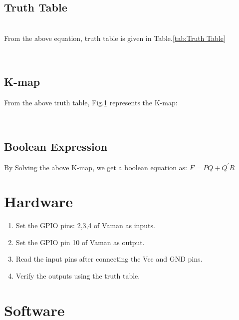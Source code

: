 \documentclass[journal,twocolumn,10pt, a4paper]{article}
\begin{document}
\subsection{Truth Table}\\
From the above equation, truth table is given in Table.\ref{tab:Truth Table}
\begin{table}[!h]
\centering

\caption{}
\label{tab:Truth Table}
\end{table}\\

\subsection{K-map}
From the above truth table, Fig.\ref{fig:Fig 2} represents the K-map:
\begin{figure}[!h]

\caption{}
\label{fig:Fig 2}
\end{figure}\\

\pagebreak

\subsection{Boolean Expression}
By Solving the above K-map, we get a boolean equation as: $F=PQ+{Q^\prime}R$

\section{Hardware}
\begin{enumerate}
\item Set the GPIO pins: 2,3,4 of Vaman as inputs.
\item Set the GPIO pin 10 of Vaman as output.
\item Read the input pins after connecting the Vcc and GND pins.
\item Verify the outputs using the truth table.
\end{enumerate}

\section{Software}

\end{document}
